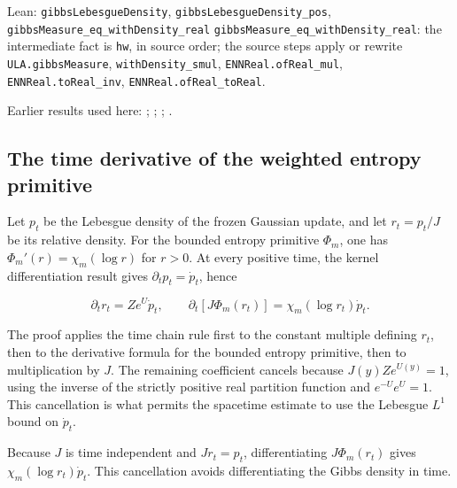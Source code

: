 \documentclass[11pt,a4paper]{report}
\begin{document}
\begin{leanbox}{Lean: \texttt{gibbsLebesgueDensity}, \texttt{gibbsLebesgueDensity\_\allowbreak{}pos}, \texttt{gibbsMeasure\_\allowbreak{}eq\_\allowbreak{}withDensity\_\allowbreak{}real}}
\texttt{gibbs\allowbreak{}Measure\_\allowbreak{}eq\_\allowbreak{}with\allowbreak{}Density\_\allowbreak{}real}: the intermediate fact is \texttt{hw}, in source order; the source steps apply or rewrite \texttt{ULA.\allowbreak{}gibbs\allowbreak{}Measure}, \texttt{with\allowbreak{}Density\_\allowbreak{}smul}, \texttt{ENNReal.\allowbreak{}of\allowbreak{}Real\_\allowbreak{}mul}, \texttt{ENNReal.\allowbreak{}to\allowbreak{}Real\_\allowbreak{}inv}, \texttt{ENNReal.\allowbreak{}of\allowbreak{}Real\_\allowbreak{}to\allowbreak{}Real}.
\end{leanbox}


Earlier results used here: \cite[Section~3.26.1]{LangevinLean2026ULASC}; \cite[Section~3.26.2]{LangevinLean2026ULASC}; \cite[Section~3.26.3]{LangevinLean2026ULASC}; \cite[Section~3.26.9]{LangevinLean2026ULASC}.
\subsection{\texorpdfstring{The time derivative of the weighted entropy primitive}{The time derivative of the weighted entropy primitive}}
\label{report-step-UnadjustedLangevin-LSI-GaussianEntropyIdentity-lean-4}


Let \(p_t\) be the Lebesgue density of the frozen Gaussian update, and let \(r_t=p_t/J\) be its relative density. For the bounded entropy primitive \(\Phi_m\), one has \(\Phi_m'(r)=\chi_m(\log r)\) for \(r>0\). At every positive time, the kernel differentiation result gives \(\partial_t p_t=\dot p_t\), hence

\[\partial_t r_t=Ze^{U}\dot p_t,\qquad \partial_t[J\Phi_m(r_t)]=\chi_m(\log r_t)\dot p_t.\]

The proof applies the time chain rule first to the constant multiple defining \(r_t\), then to the derivative formula for the bounded entropy primitive, then to multiplication by \(J\). The remaining coefficient cancels because \(J(y)Ze^{U(y)}=1\), using the inverse of the strictly positive real partition function and \(e^{-U}e^U=1\). This cancellation is what permits the spacetime estimate to use the Lebesgue \(L^1\) bound on \(\dot p_t\).



Because \(J\) is time independent and \(Jr_t=p_t\), differentiating \(J\Phi_m(r_t)\) gives \(\chi_m(\log r_t)\dot p_t\). This cancellation avoids differentiating the Gibbs density in time.
\end{document}
